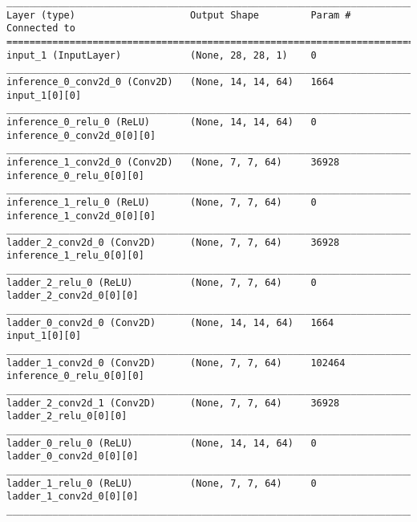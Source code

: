 \begin{lstlisting}[caption={\textsc{Mnist}-\ac{VLAE}-factor-1 Encoder},captionpos=b,basicstyle=\tiny, label={lst:sparsity-vlae-encoder-28-fm1}]
__________________________________________________________________________________________________
Layer (type)                    Output Shape         Param #     Connected to
==================================================================================================
input_1 (InputLayer)            (None, 28, 28, 1)    0
__________________________________________________________________________________________________
inference_0_conv2d_0 (Conv2D)   (None, 14, 14, 64)   1664        input_1[0][0]
__________________________________________________________________________________________________
inference_0_relu_0 (ReLU)       (None, 14, 14, 64)   0           inference_0_conv2d_0[0][0]
__________________________________________________________________________________________________
inference_1_conv2d_0 (Conv2D)   (None, 7, 7, 64)     36928       inference_0_relu_0[0][0]
__________________________________________________________________________________________________
inference_1_relu_0 (ReLU)       (None, 7, 7, 64)     0           inference_1_conv2d_0[0][0]
__________________________________________________________________________________________________
ladder_2_conv2d_0 (Conv2D)      (None, 7, 7, 64)     36928       inference_1_relu_0[0][0]
__________________________________________________________________________________________________
ladder_2_relu_0 (ReLU)          (None, 7, 7, 64)     0           ladder_2_conv2d_0[0][0]
__________________________________________________________________________________________________
ladder_0_conv2d_0 (Conv2D)      (None, 14, 14, 64)   1664        input_1[0][0]
__________________________________________________________________________________________________
ladder_1_conv2d_0 (Conv2D)      (None, 7, 7, 64)     102464      inference_0_relu_0[0][0]
__________________________________________________________________________________________________
ladder_2_conv2d_1 (Conv2D)      (None, 7, 7, 64)     36928       ladder_2_relu_0[0][0]
__________________________________________________________________________________________________
ladder_0_relu_0 (ReLU)          (None, 14, 14, 64)   0           ladder_0_conv2d_0[0][0]
__________________________________________________________________________________________________
ladder_1_relu_0 (ReLU)          (None, 7, 7, 64)     0           ladder_1_conv2d_0[0][0]
__________________________________________________________________________________________________

\end{lstlisting}
